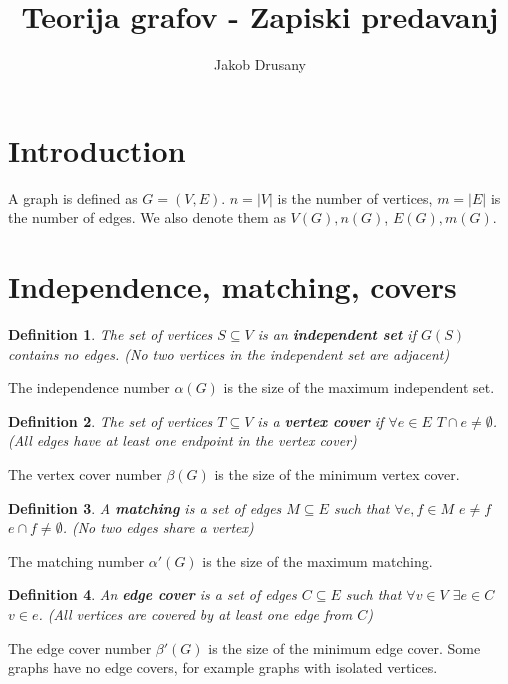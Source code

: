 \documentclass[notitlepage]{article}
\title{Teorija grafov - Zapiski predavanj}
\author{Jakob Drusany}
\newtheorem*{definition}{Definition}
\begin{document}
\maketitle
\vspace{1cm}
\tableofcontents
\thispagestyle{empty}
\newpage
{} 
\section{Introduction}
A graph is defined as $G = (V, E)$. $n = |V|$ is the number of vertices, $m = |E|$ is the number of edges.
We also denote them as $V(G), n(G)$, $E(G), m(G)$.
\section{Independence, matching, covers}
\begin{definition}
  The set of vertices $S \subseteq V$ is an \textbf{independent set} if $G(S)$ contains no edges.
  (No two vertices in the independent set are adjacent)
\end{definition}
The independence number $\alpha(G)$ is the size of the maximum independent set.
\begin{definition}
The set of vertices $T \subseteq V$ is a \textbf{vertex cover} if $\forall e \in E$ $T \cap e \neq \emptyset$.
(All edges have at least one endpoint in the vertex cover)
\end{definition}
The vertex cover number $\beta(G)$ is the size of the minimum vertex cover.
\begin{definition}
  A \textbf{matching} is a set of edges $M \subseteq E$ such that $\forall e, f \in M$ $e\neq f$ $e\cap f\neq \emptyset$.
  (No two edges share a vertex)
\end{definition}
The matching number $\alpha'(G)$ is the size of the maximum matching.
\begin{definition}
  An \textbf{edge cover} is a set of edges $C \subseteq E$ such that $\forall v \in V$ $\exists e \in C$ $v \in e$.
  (All vertices are covered by at least one edge from $C$)
\end{definition}
The edge cover number $\beta'(G)$ is the size of the minimum edge cover.
Some graphs have no edge covers, for example graphs with isolated vertices.
\end{document}
